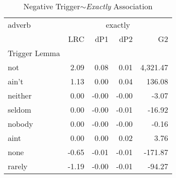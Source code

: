 
\begin{table}[ht]
\caption{Negative Trigger$\sim$\textit{Exactly} Association}
\label{trigger-exactly-AM}
\begin{tabular}{lrrrr}
\toprule
adverb & \multicolumn{4}{c}{exactly} \\
 & LRC & dP1 & dP2 & G2 \\
Trigger Lemma &  &  &  &  \\
\midrule
not & {\cellcolor[HTML]{67001F}} \color[HTML]{F1F1F1} 2.09 & {\cellcolor[HTML]{67001F}} \color[HTML]{F1F1F1} 0.08 & {\cellcolor[HTML]{F0F4F6}} \color[HTML]{000000} 0.01 & {\cellcolor[HTML]{67001F}} \color[HTML]{F1F1F1} 4,321.47 \\
ain't & {\cellcolor[HTML]{CB4942}} \color[HTML]{F1F1F1} 1.13 & {\cellcolor[HTML]{8DC2DC}} \color[HTML]{000000} 0.00 & {\cellcolor[HTML]{67001F}} \color[HTML]{F1F1F1} 0.04 & {\cellcolor[HTML]{BDDBEA}} \color[HTML]{000000} 136.08 \\
neither & {\cellcolor[HTML]{FACAB1}} \color[HTML]{000000} 0.00 & {\cellcolor[HTML]{7EB8D7}} \color[HTML]{000000} -0.00 & {\cellcolor[HTML]{4997C5}} \color[HTML]{F1F1F1} -0.00 & {\cellcolor[HTML]{AED3E6}} \color[HTML]{000000} -3.07 \\
seldom & {\cellcolor[HTML]{FACAB1}} \color[HTML]{000000} 0.00 & {\cellcolor[HTML]{7EB8D7}} \color[HTML]{000000} -0.00 & {\cellcolor[HTML]{0E4179}} \color[HTML]{F1F1F1} -0.01 & {\cellcolor[HTML]{AED3E6}} \color[HTML]{000000} -16.92 \\
nobody & {\cellcolor[HTML]{FACAB1}} \color[HTML]{000000} 0.00 & {\cellcolor[HTML]{7EB8D7}} \color[HTML]{000000} -0.00 & {\cellcolor[HTML]{65A9CF}} \color[HTML]{F1F1F1} -0.00 & {\cellcolor[HTML]{AED3E6}} \color[HTML]{000000} -0.16 \\
aint & {\cellcolor[HTML]{FACAB1}} \color[HTML]{000000} 0.00 & {\cellcolor[HTML]{81BAD8}} \color[HTML]{000000} 0.00 & {\cellcolor[HTML]{FAE7DC}} \color[HTML]{000000} 0.02 & {\cellcolor[HTML]{AED3E6}} \color[HTML]{000000} 3.76 \\
none & {\cellcolor[HTML]{F8F2EF}} \color[HTML]{000000} -0.65 & {\cellcolor[HTML]{569FC9}} \color[HTML]{F1F1F1} -0.01 & {\cellcolor[HTML]{246AAE}} \color[HTML]{F1F1F1} -0.01 & {\cellcolor[HTML]{A0CCE2}} \color[HTML]{000000} -171.87 \\
rarely & {\cellcolor[HTML]{D8E9F1}} \color[HTML]{000000} -1.19 & {\cellcolor[HTML]{75B2D4}} \color[HTML]{F1F1F1} -0.00 & {\cellcolor[HTML]{08366A}} \color[HTML]{F1F1F1} -0.01 & {\cellcolor[HTML]{A7D0E4}} \color[HTML]{000000} -94.27 \\

\end{tabular}
\end{table}
